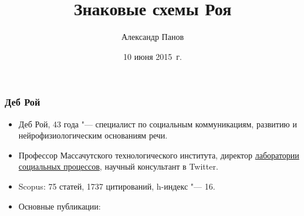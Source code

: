 \documentclass[default]{beamer}
\begin{document}
	
	\title[Semiotic schemas]{Знаковые схемы Роя}
	\author[Панов]{Александр Панов}
	\date{10 июня 2015~г.} 
	
	\begin{frame}
		\titlepage
	\end{frame}
	
	\begin{frame}
		\frametitle{Деб Рой}
		
		\begin{itemize}
			\item Деб Рой, 43 года "--- специалист по социальным коммуникациям, развитию и нейрофизиологическим основаниям речи.
			\item Профессор Массачутского технологического института, директор \href{http://socialmachines.media.mit.edu/}{лаборатории социальных процессов}, научный консультант в Twitter.
			\item Scopus: 75 статей, 1737 цитирований, h-индекс "--- 16.
			\item Основные публикации:

			\nocite{*}
			\printbibliography[keyword={roy}]

		\end{itemize}
	\end{frame}
	
\end{document}
